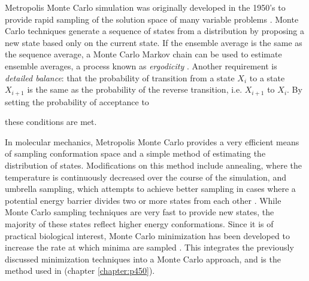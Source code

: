 Metropolis Monte Carlo simulation was originally developed in the 1950's to provide rapid sampling of the solution space of many variable problems \cite{metropolis1953equation,hastings1970monte}.
Monte Carlo techniques generate a sequence of states from a distribution by proposing a new state based only on the current state.
If the ensemble average is the same as the sequence average, a Monte Carlo Markov chain can be used to estimate ensemble averages, a process known as {\it ergodicity} \cite{schlick2010molecular}.
Another requirement is {\it detailed balance}: that the probability of transition from a state $X_{i}$ to a state $X_{i+1}$ is the same as the probability of the reverse transition, i.e. $X_{i+1}$ to $X_{i}$.
By setting the probability of acceptance to

these conditions are met.

In molecular mechanics, Metropolis Monte Carlo provides a very efficient means of sampling conformation space and a simple method of estimating the distribution of states.
Modifications on this method include annealing, where the temperature is continuously decreased over the course of the simulation, and umbrella sampling, which attempts to achieve better sampling in cases where a potential energy barrier divides two or more states from each other \cite{torrie1977nonphysical}.
While Monte Carlo sampling techniques are very fast to provide new states, the majority of these states reflect higher energy conformations.
Since it is of practical biological interest, Monte Carlo minimization has been developed to increase the rate at which minima are sampled \cite{li1987monte}.
This integrates the previously discussed minimization techniques into a Monte Carlo approach, and is the method used in  (chapter \ref{chapter:p450}).
